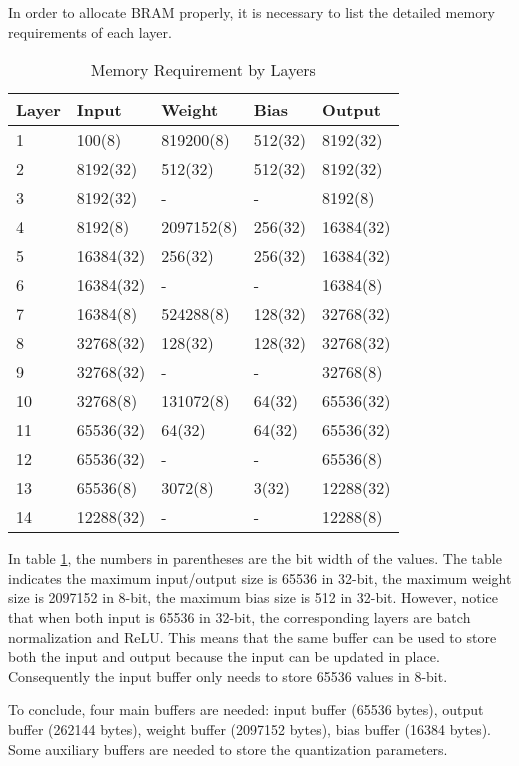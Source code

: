 In order to allocate BRAM properly, it is necessary to list the detailed memory requirements of each layer.

\begin{table}[h]
  \centering
  \caption{Memory Requirement by Layers}
  \begin{tabular}{l | l | l | l | l}
    \toprule
    Layer & Input & Weight & Bias & Output \\
    \midrule
    1 & 100(8) & 819200(8) & 512(32) & 8192(32) \\
    2 & 8192(32) & 512(32) & 512(32) & 8192(32) \\
    3 & 8192(32) & - & - & 8192(8) \\
    4 & 8192(8) & 2097152(8) & 256(32) & 16384(32) \\
    5 & 16384(32) & 256(32) & 256(32) & 16384(32) \\
    6 & 16384(32) & - & - & 16384(8) \\
    7 & 16384(8) & 524288(8) & 128(32) & 32768(32) \\
    8 & 32768(32) & 128(32) & 128(32) & 32768(32) \\
    9 & 32768(32) & - & - & 32768(8) \\
    10 & 32768(8) & 131072(8) & 64(32) & 65536(32) \\
    11 & 65536(32) & 64(32) & 64(32) & 65536(32) \\
    12 & 65536(32) & - & - & 65536(8) \\
    13 & 65536(8) & 3072(8) & 3(32) & 12288(32) \\
    14 & 12288(32) & - & - & 12288(8) \\
    \bottomrule
  \end{tabular}
  \label{table:memory_requirements}
\end{table}

In table \ref{table:memory_requirements}, the numbers in parentheses are the bit width of the values. The table
indicates the maximum input/output size is 65536 in 32-bit, the maximum weight size is 2097152 in 8-bit, the
maximum bias size is 512 in 32-bit. However, notice that when both input is 65536 in 32-bit, the corresponding
layers are batch normalization and ReLU. This means that the same buffer can be used to store both the
input and output because the input can be updated in place. Consequently the input buffer only needs to
store 65536 values in 8-bit.

To conclude, four main buffers are needed: input buffer (65536 bytes), output buffer (262144 bytes),
weight buffer (2097152 bytes), bias buffer (16384 bytes). Some auxiliary buffers are needed to store
the quantization parameters.

